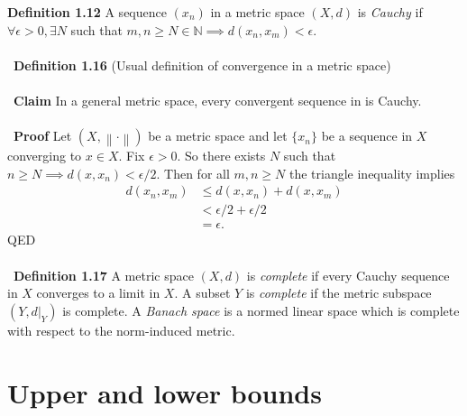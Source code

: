 \documentclass[12 pt]{article}
\newcommand{\N}{\mathbb{N}}
\newcommand{\nm}[1]{\left\| #1 \right\|}
\numberwithin{equation}{section}
\begin{document}
{\textbf{Definition 1.12} A sequence $(x_n)$ in a metric space $(X, d)$ is \textit{Cauchy} if $\forall \epsilon > 0, \exists N$ such that $m, n \geq N \in \N \implies d(x_n, x_m) < \epsilon$.\\
\\
\
\textbf{Definition 1.16} (Usual definition of convergence in a metric space)\\
\\
\
\textbf{Claim} In a general metric space, every convergent sequence in is Cauchy.\\
\\
\
\textbf{Proof} Let $(X, \nm{\cdot})$ be a metric space and let $\{x_n\}$ be a sequence in $X$ converging to $x \in X$. Fix $\epsilon > 0$. So there exists $N$ such that $n \geq N \implies d(x, x_n) < \epsilon/2$. Then for all $m, n \geq N$ the triangle inequality implies \begin{align*}
d(x_n, x_m) & \leq d(x, x_n) + d(x, x_m) \\
\ & < \epsilon/2 + \epsilon / 2 \\
\ & = \epsilon.
\end{align*}
QED\\
\\
\
\textbf{Definition 1.17} A metric space $(X, d)$ is \textit{complete} if every Cauchy sequence in $X$ converges to a limit in $X$. A subset $Y$ is \textit{complete} if the metric subspace $(Y, d|_Y)$ is complete. A \textit{Banach space} is a normed linear space which is complete with respect to the norm-induced metric.















\section{Upper and lower bounds}

}
\end{document}
